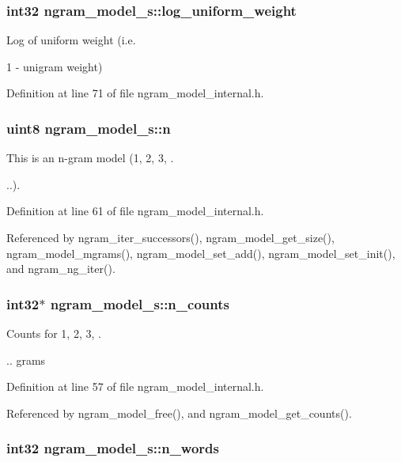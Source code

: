 \subsubsection[{log\_\-uniform\_\-weight}]{\setlength{\rightskip}{0pt plus 5cm}int32 {\bf ngram\_\-model\_\-s::log\_\-uniform\_\-weight}}\label{structngram__model__s_a38c5fdecaefd9a2f43b69f26ae492c1}


Log of uniform weight (i.e. 

1 - unigram weight) 

Definition at line 71 of file ngram\_\-model\_\-internal.h.
\subsubsection[{n}]{\setlength{\rightskip}{0pt plus 5cm}uint8 {\bf ngram\_\-model\_\-s::n}}\label{structngram__model__s_3c87bc1b678662a2c8930b3b8c33a80f}


This is an n-gram model (1, 2, 3, . 

..). 

Definition at line 61 of file ngram\_\-model\_\-internal.h.

Referenced by ngram\_\-iter\_\-successors(), ngram\_\-model\_\-get\_\-size(), ngram\_\-model\_\-mgrams(), ngram\_\-model\_\-set\_\-add(), ngram\_\-model\_\-set\_\-init(), and ngram\_\-ng\_\-iter().
\subsubsection[{n\_\-counts}]{\setlength{\rightskip}{0pt plus 5cm}int32$\ast$ {\bf ngram\_\-model\_\-s::n\_\-counts}}\label{structngram__model__s_9dcba9b49cc1cd189b257e5838da0eee}


Counts for 1, 2, 3, . 

.. grams 

Definition at line 57 of file ngram\_\-model\_\-internal.h.

Referenced by ngram\_\-model\_\-free(), and ngram\_\-model\_\-get\_\-counts().
\subsubsection[{n\_\-words}]{\setlength{\rightskip}{0pt plus 5cm}int32 {\bf ngram\_\-model\_\-s::n\_\-words}}\label{structngram__model__s_74f85927ef0d5513a1e6c02d13864be3}


